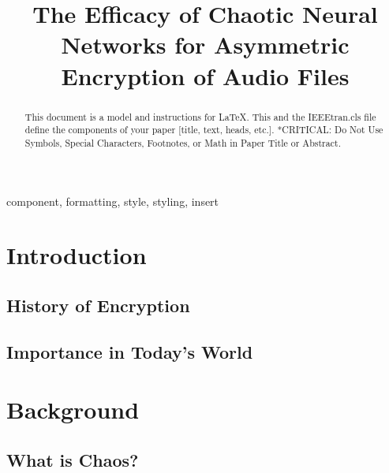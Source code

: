 \documentclass[conference]{IEEEtran}
\begin{document}
\title{The Efficacy of Chaotic Neural Networks for Asymmetric Encryption of Audio Files}

\author{
}

\maketitle

\begin{abstract}
This document is a model and instructions for \LaTeX.
This and the IEEEtran.cls file define the components of your paper [title, text, heads, etc.]. *CRITICAL: Do Not Use Symbols, Special Characters, Footnotes, 
or Math in Paper Title or Abstract.
\end{abstract}

\begin{IEEEkeywords}
component, formatting, style, styling, insert
\end{IEEEkeywords}

\section{Introduction}\label{sec:introduction}

\subsection{History of Encryption}\label{subsec:history-of-encryption}

\subsection{Importance in Today's World}\label{subsec:importance-in-today's-world}

\section{Background}\label{sec:background}

\subsection{What is Chaos?}\label{subsec:what-is-chaos?}
\end{document}
